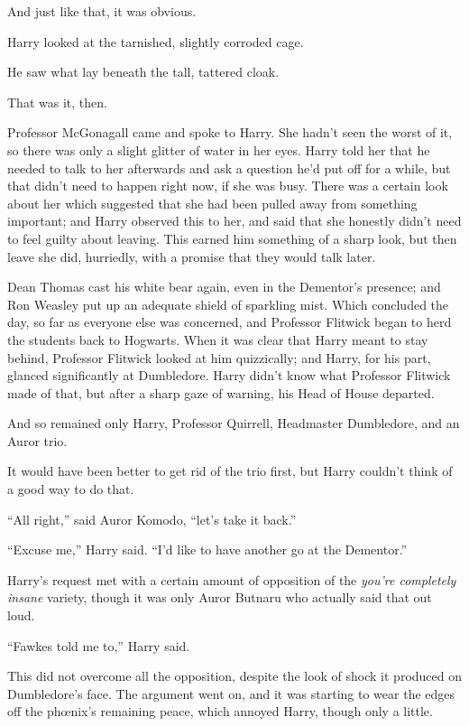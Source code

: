 And just like that, it was obvious.

Harry looked at the tarnished, slightly corroded cage.

He saw what lay beneath the tall, tattered cloak.

That was it, then.

Professor McGonagall came and spoke to Harry. She hadn’t seen the worst of it, so there was only a slight glitter of water in her eyes. Harry told her that he needed to talk to her afterwards and ask a question he’d put off for a while, but that didn’t need to happen right now, if she was busy. There was a certain look about her which suggested that she had been pulled away from something important; and Harry observed this to her, and said that she honestly didn’t need to feel guilty about leaving. This earned him something of a sharp look, but then leave she did, hurriedly, with a promise that they would talk later.

Dean Thomas cast his white bear again, even in the Dementor’s presence; and Ron Weasley put up an adequate shield of sparkling mist. Which concluded the day, so far as everyone else was concerned, and Professor Flitwick began to herd the students back to Hogwarts. When it was clear that Harry meant to stay behind, Professor Flitwick looked at him quizzically; and Harry, for his part, glanced significantly at Dumbledore. Harry didn’t know what Professor Flitwick made of that, but after a sharp gaze of warning, his Head of House departed.

And so remained only Harry, Professor Quirrell, Headmaster Dumbledore, and an Auror trio.

It would have been better to get rid of the trio first, but Harry couldn’t think of a good way to do that.

“All right,” said Auror Komodo, “let’s take it back.”

“Excuse me,” Harry said. “I’d like to have another go at the Dementor.”

\later

Harry’s request met with a certain amount of opposition of the \emph{you’re completely insane} variety, though it was only Auror Butnaru who actually said that out loud.

“Fawkes told me to,” Harry said.

This did not overcome all the opposition, despite the look of shock it produced on Dumbledore’s face. The argument went on, and it was starting to wear the edges off the phœnix’s remaining peace, which annoyed Harry, though only a little.

